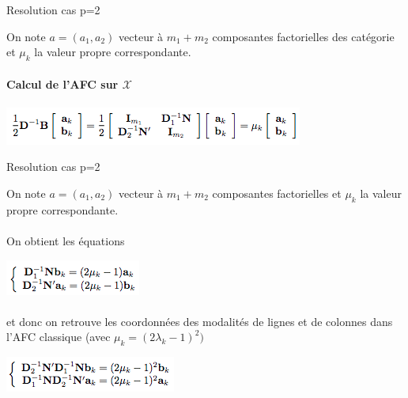 \documentclass[12pt]{beamer}
\begin{document}

\begin{frame}{Resolution cas p=2}
 
\centering 

 On note $a = (a_{1},  a_{2})$ vecteur à $m_1 +  m_2$ composantes   factorielles des catégorie et $\mu_k$ la valeur propre correspondante. \\ \ \\
 

 
 \textbf{Calcul de l'AFC sur $\mathcal{X}$}\\ \ \\
 
 
  \includegraphics[scale=0.8]{AFC1} 
  
 
\end{frame}



\begin{frame}{Resolution cas p=2}
 
\centering 

 On note $a = (a_{1},  a_{2})$ vecteur à $m_1 +  m_2$ composantes   factorielles et $\mu_k$ la valeur propre correspondante.\\ \ \\
 
 
  
  On obtient les équations
  
   \includegraphics[scale=0.7]{AFC2} \\ \ \\
  
 et donc on retrouve les coordonnées des modalités de lignes
et de colonnes dans l'AFC classique (avec 
$\mu_k =(2\lambda_k - 1)^2) $

 \includegraphics[scale=0.7]{AFC3} 
 
\end{frame}
\end{document}
